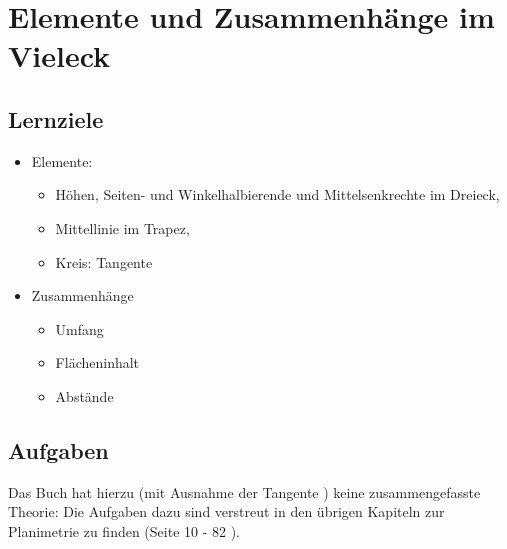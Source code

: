 \IstinVieleckeEingebunden

\section{Elemente und Zusammenhänge im Vieleck}



\subsection*{Lernziele}

\begin{itemize}
\item Elemente:
  \begin{itemize}
  \item Höhen, Seiten- und Winkelhalbierende und
    Mittelsenkrechte im Dreieck,
  \item Mittellinie im Trapez,
  \item Kreis: Tangente
  \end{itemize}
\item Zusammenhänge
  \begin{itemize}
  \item
    Umfang
  \item
    Flächeninhalt 
  \item
    Abstände
  \end{itemize}
\end{itemize}



\subsection*{Aufgaben}
Das Buch hat hierzu (mit Ausnahme der Tangente ) keine zusammengefasste Theorie: Die Aufgaben dazu sind verstreut in den übrigen Kapiteln zur Planimetrie zu finden (Seite 10 - 82 \cite{frommenwiler18geom}).
\newpage
